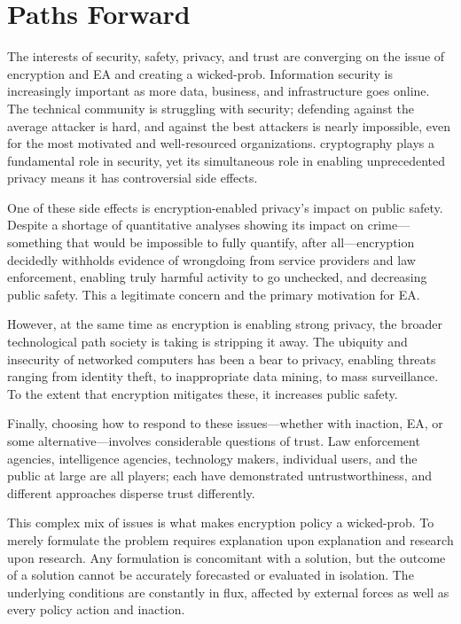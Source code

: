 \chapter{Paths Forward}
\label{chap-pathsforward}

The interests of security, safety, privacy, and trust are converging on the issue of encryption and \acl{EA} and
creating a \ac{wicked-prob}. Information security is increasingly important as more data, business, and infrastructure
goes online. The technical community is struggling with security; defending against the average attacker is hard, and
against the best attackers is nearly impossible, even for the most motivated and well-resourced organizations.
\Ac{cryptography} plays a fundamental role in security, yet its simultaneous role in enabling unprecedented privacy
means it has controversial side effects.

One of these side effects is encryption-enabled privacy's impact on public safety. Despite a shortage of quantitative
analyses showing its impact on crime---something that would be impossible to fully quantify, after all---encryption
decidedly withholds evidence of wrongdoing from service providers and law enforcement, enabling truly harmful activity
to go unchecked, and decreasing public safety. This a legitimate concern and the primary motivation for \ac{EA}.

However, at the same time as encryption is enabling strong privacy, the broader technological path society is taking is
stripping it away. The ubiquity and insecurity of networked computers has been a bear to privacy, enabling threats
ranging from identity theft, to inappropriate data mining, to mass surveillance. To the extent that encryption mitigates
these, it increases public safety.

Finally, choosing how to respond to these issues---whether with inaction, \ac{EA}, or some alternative---involves
considerable questions of trust. Law enforcement agencies, intelligence agencies, technology makers, individual users,
and the public at large are all players; each have demonstrated untrustworthiness, and different approaches disperse
trust differently.


This complex mix of issues is what makes encryption policy a \ac{wicked-prob}. To merely formulate the problem requires
explanation upon explanation and research upon research. Any formulation is concomitant with a solution, but the outcome
of a solution cannot be accurately forecasted or evaluated in isolation. The underlying conditions are constantly in
flux, affected by external forces as well as every policy action and inaction.

